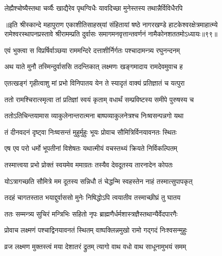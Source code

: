 \twolineshloka
{लेह्यैश्चोष्यैस्तथा चर्व्यैः खाद्यैरेव पृथग्विधैः}
{यावदिच्छा मुनेस्तस्य तथान्नैर्विविधैरपि}%

॥इति श्रीस्कान्दे महापुराण एकाशीतिसाहस्र्यां संहितायां षष्ठे नागरखण्डे हाटकेश्वरक्षेत्रमाहात्म्ये रामेश्वरस्थापनप्रस्तावे श्रीरामम्प्रति दुर्वासः समागमनवृत्तान्तवर्णनं नामैकोनशततमोऽध्यायः॥९९॥

\resetShloka


\twolineshloka
{एवं भुक्त्वा स विप्रर्षिर्वाञ्छया राममन्दिरे}
{दत्ताशीर्निर्गतः पश्चादामन्त्र्य रघुनन्दनम्}%

\twolineshloka
{अथ याते मुनौ तस्मिन्दुर्वाससि तदन्तिकात्}
{लक्ष्मणः खङ्गमादाय रामदेवमुवाच ह}%

\twolineshloka
{एतत्खङ्गं गृहीत्वाशु मां प्रभो विनिपातय}
{येन ते स्यादृतं वाक्यं प्रतिज्ञातं च यत्पुरा}%

\twolineshloka
{ततो रामश्चिरात्स्मृत्वा तां प्रतिज्ञां स्वयं कृताम्}
{वधार्थं सम्प्रविष्टस्य समीपे पुरुषस्य च}%

\twolineshloka
{ततोऽतिचिन्तयामास व्याकुलेनान्तरात्मना}
{बाष्पव्याकुलनेत्रश्च निःष्वसन्पन्नगो यथा}%

\twolineshloka
{तं दीनवदनं दृष्ट्वा निःष्वसन्तं मुहुर्मुहुः}
{भूयः प्रोवाच सौमित्रिर्विनयावनतः स्थितः}%

\twolineshloka
{एष एव परो धर्मो भूपतीनां विशेषतः}
{यथात्मीयं वचस्तथ्यं क्रियते निर्विकल्पितम्}%

\twolineshloka
{तस्मात्त्वया प्रभो प्रोक्तं स्वयमेव ममाग्रतः}
{तस्यैव देवदूतस्य तारनादेन कोपतः}%

\twolineshloka
{योऽत्रागच्छति सौमित्रे मम दूतस्य सन्निधौ}
{तं चेद्धन्मि स्वहस्तेन नाहं तस्मात्सुपापकृत्}%

\twolineshloka
{तदहं चागतस्तात भयाद्दुर्वाससो मुनेः}
{निषिद्धोऽपि त्वयातीव तस्माच्छीघ्रं तु घातय}%

\twolineshloka
{ततः सम्मन्त्र्य सुचिरं मन्त्रिभिः सहितो नृपः}
{ब्राह्मणैर्धर्मशास्त्रज्ञैस्तथान्यैर्वेदपारगैः}%

\twolineshloka
{प्रोवाच लक्ष्मणं पश्चाद्विनयावनतं स्थितम्}
{वाष्पक्लिन्नमुखो रामो गद्गदं निःश्वसन्मुहुः}%

\twolineshloka
{व्रज लक्ष्मण मुक्तस्त्वं मया देशातरं द्रुतम्}
{त्यागो वाथ वधो वाथ साधूनामुभयं समम्}%

